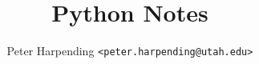 \documentclass[12pt,letterpaper,oneside]{memoir}
\theoremstyle{plain}
\theoremstyle{definition}
\begin{document}
\title{Python Notes}
\author{Peter Harpending \texttt{<peter.harpending@utah.edu>}}
\maketitle

\tableofcontents



\printbibliography
\end{document}
